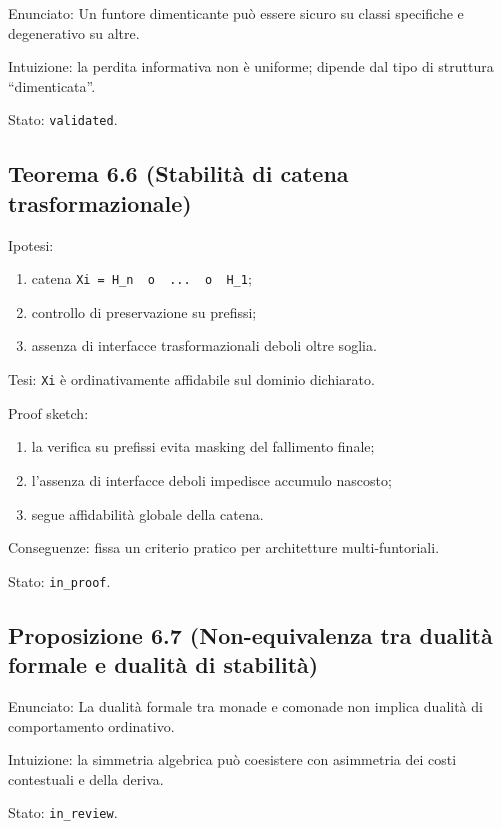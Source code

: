 Enunciato:
Un funtore dimenticante può essere sicuro su classi specifiche e degenerativo su altre.

Intuizione:
la perdita informativa non è uniforme; dipende dal tipo di struttura ``dimenticata''.

Stato: \texttt{validated}.

\subsection{Teorema 6.6 (Stabilità di catena trasformazionale)}

Ipotesi:

\begin{enumerate}
\def\labelenumi{\arabic{enumi}.}
\tightlist
\item
  catena \texttt{Xi\ =\ H\_n\ \ o\ \ ...\ \ o\ \ H\_1};
\item
  controllo di preservazione su prefissi;
\item
  assenza di interfacce trasformazionali deboli oltre soglia.
\end{enumerate}

Tesi:
\texttt{Xi} è ordinativamente affidabile sul dominio dichiarato.

Proof sketch:

\begin{enumerate}
\def\labelenumi{\arabic{enumi}.}
\tightlist
\item
  la verifica su prefissi evita masking del fallimento finale;
\item
  l'assenza di interfacce deboli impedisce accumulo nascosto;
\item
  segue affidabilità globale della catena.
\end{enumerate}

Conseguenze:
fissa un criterio pratico per architetture multi-funtoriali.

Stato: \texttt{in\_proof}.

\subsection{Proposizione 6.7 (Non-equivalenza tra dualità formale e dualità di stabilità)}

Enunciato:
La dualità formale tra monade e comonade non implica dualità di comportamento ordinativo.

Intuizione:
la simmetria algebrica può coesistere con asimmetria dei costi contestuali e della deriva.

Stato: \texttt{in\_review}.

